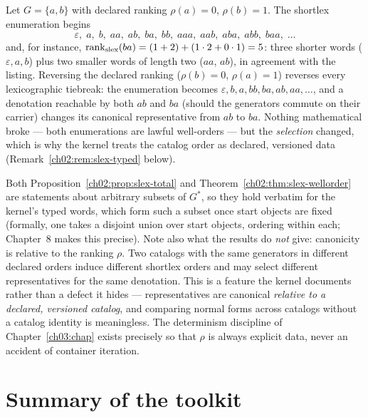 \begin{example}\label{ch02:ex:slex-two}
Let $G = \{ a, b \}$ with declared ranking $\rho(a) = 0$,
$\rho(b) = 1$. The shortlex enumeration begins
\[
\varepsilon,\; a,\; b,\; aa,\; ab,\; ba,\; bb,\; aaa,\; aab,\; aba,\;
abb,\; baa,\; \dots
\]
and, for instance, $\mathrm{rank}_{\mathrm{slex}}(ba) = (1 + 2) +
(1 \cdot 2 + 0 \cdot 1) = 5$: three shorter words
($\varepsilon, a, b$) plus two smaller words of length two
($aa$, $ab$), in agreement with the listing. Reversing the declared
ranking ($\rho(b) = 0$, $\rho(a) = 1$) reverses every lexicographic
tiebreak: the enumeration becomes $\varepsilon, b, a, bb, ba, ab, aa,
\dots$, and a denotation reachable by both $ab$ and $ba$ (should the
generators commute on their carrier) changes its canonical
representative from $ab$ to $ba$. Nothing mathematical broke ---
both enumerations are lawful well-orders --- but the \emph{selection}
changed, which is why the kernel treats the catalog order as declared,
versioned data (Remark~\ref{ch02:rem:slex-typed} below).
\end{example}

\begin{remark}\label{ch02:rem:slex-typed}
Both Proposition~\ref{ch02:prop:slex-total} and
Theorem~\ref{ch02:thm:slex-wellorder} are statements about arbitrary
subsets of $G^{*}$, so they hold verbatim for the kernel's typed words,
which form such a subset once start objects are fixed (formally, one takes
a disjoint union over start objects, ordering within each; Chapter~8 makes
this precise). Note also what the results do \emph{not} give: canonicity
is relative to the ranking $\rho$. Two catalogs with the same generators
in different declared orders induce different shortlex orders and may
select different representatives for the same denotation. This is a
feature the kernel documents rather than a defect it hides ---
representatives are canonical \emph{relative to a declared, versioned
catalog}, and comparing normal forms across catalogs without a catalog
identity is meaningless. The determinism discipline of
Chapter~\ref{ch03:chap} exists precisely so that $\rho$ is always explicit
data, never an accident of container iteration.
\end{remark}

\section{Summary of the toolkit}\label{ch02:sec:summary}

